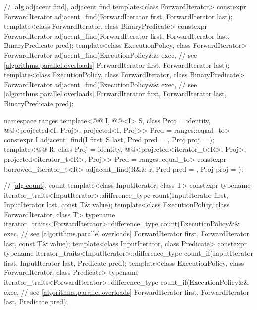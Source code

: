 \begin{codeblock}
{  // \ref{alg.adjacent.find}, adjacent find
  template<class ForwardIterator>
    constexpr ForwardIterator
      adjacent_find(ForwardIterator first, ForwardIterator last);
  template<class ForwardIterator, class BinaryPredicate>
    constexpr ForwardIterator
      adjacent_find(ForwardIterator first, ForwardIterator last,
                    BinaryPredicate pred);
  template<class ExecutionPolicy, class ForwardIterator>
    ForwardIterator
      adjacent_find(ExecutionPolicy&& exec,                     // see \ref{algorithms.parallel.overloads}
                    ForwardIterator first, ForwardIterator last);
  template<class ExecutionPolicy, class ForwardIterator, class BinaryPredicate>
    ForwardIterator
      adjacent_find(ExecutionPolicy&& exec,                     // see \ref{algorithms.parallel.overloads}
                    ForwardIterator first, ForwardIterator last,
                    BinaryPredicate pred);

  namespace ranges {
    template<@@ I, @@<I> S, class Proj = identity,
             @@<projected<I, Proj>,
                                       projected<I, Proj>> Pred = ranges::equal_to>
      constexpr I adjacent_find(I first, S last, Pred pred = {},
                                Proj proj = {});
    template<@@ R, class Proj = identity,
             @@<projected<iterator_t<R>, Proj>,
                                       projected<iterator_t<R>, Proj>> Pred = ranges::equal_to>
      constexpr borrowed_iterator_t<R>
        adjacent_find(R&& r, Pred pred = {}, Proj proj = {});
  }

  // \ref{alg.count}, count
  template<class InputIterator, class T>
    constexpr typename iterator_traits<InputIterator>::difference_type
      count(InputIterator first, InputIterator last, const T& value);
  template<class ExecutionPolicy, class ForwardIterator, class T>
    typename iterator_traits<ForwardIterator>::difference_type
      count(ExecutionPolicy&& exec,                             // see \ref{algorithms.parallel.overloads}
            ForwardIterator first, ForwardIterator last, const T& value);
  template<class InputIterator, class Predicate>
    constexpr typename iterator_traits<InputIterator>::difference_type
      count_if(InputIterator first, InputIterator last, Predicate pred);
  template<class ExecutionPolicy, class ForwardIterator, class Predicate>
    typename iterator_traits<ForwardIterator>::difference_type
      count_if(ExecutionPolicy&& exec,                          // see \ref{algorithms.parallel.overloads}
               ForwardIterator first, ForwardIterator last, Predicate pred);

}
\end{codeblock}
